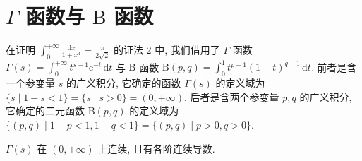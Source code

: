 \section{\texorpdfstring{$\Gamma$ 函数与 $\mathrm{B}$ 函数}{Gamma 函数与 B 函数}}\label{sec:15.4}

在证明 $\displaystyle\int_{0}^{+\infty}\frac{\mathrm{d}x}{1+x^{4}}=\frac{\pi}{2\sqrt{2}}$ 的证法 2 中, 我们借用了 $\Gamma$ 函数 $\displaystyle\Gamma(s)=\int_{0}^{+\infty}t^{s-1}\mathrm{e}^{-t}\,\mathrm{d}t$ 与 $\mathrm{B}$ 函数 $\displaystyle\mathrm{B}(p,q)=\int_{0}^{1}t^{p-1}(1-t)^{q-1}\,\mathrm{d}t$. 前者是含一个参变量 $s$ 的广义积分, 它确定的函数 $\Gamma(s)$ 的定义域为 $\{s\mid 1-s<1\}=\{s\mid s>0\}=(0,+\infty)$. 后者是含两个参变量 $p,q$ 的广义积分, 它确定的二元函数 $\mathrm{B}(p,q)$ 的定义域为 $\{(p,q)\mid 1-p<1, 1-q<1\}=\{(p,q)\mid p>0, q>0\}$.

\begin{theorem}\label{thm:15.4.1}
$\Gamma(s)$ 在 $(0,+\infty)$ 上连续, 且有各阶连续导数.
\end{theorem}

